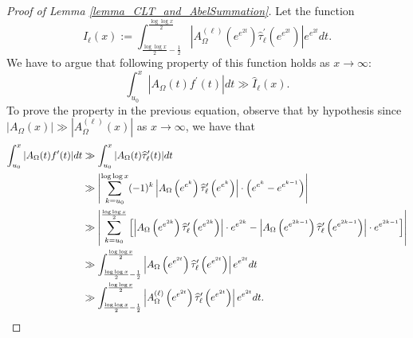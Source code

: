 \documentclass[11pt,reqno,a4letter]{article}
\numberwithin{figure}{section}
\numberwithin{table}{section}
\theoremstyle{plain}
\numberwithin{theorem}{section}
\theoremstyle{definition}
\begin{document}
\begin{proof}[Proof of Lemma \ref{lemma_CLT_and_AbelSummation}]
Let the function 
\[
\widehat{I}_{\ell}(x) := \int_{\frac{\log\log x}{2} - \frac{1}{2}}^{\frac{\log\log x}{2}} 
     \left\lvert A_{\Omega}^{(\ell)}\left(e^{e^{2t}}\right) 
     \widehat{\tau}_{\ell}^{\prime}\left(e^{e^{2t}}\right) 
     \right\rvert e^{e^{2t}} dt. 
\]
We have to argue that following property of this function holds as $x \rightarrow \infty$: 
$$\int_{u_0}^{x} 
     |A_{\Omega}(t) f^{\prime}(t)| dt \gg \widehat{I}_{\ell}(x).$$
To prove the property in the previous equation, observe that by hypothesis since 
$|A_{\Omega}(x)| \gg |A_{\Omega}^{(\ell)}(x)|$ as $x \rightarrow \infty$, 
we have that 
\begin{align*} 
\int_{u_0}^{x} |A_{\Omega}(t) f^{\prime}(t)| dt & \gg 
     \int_{u_0}^{x} |A_{\Omega}(t) \widehat{\tau}_{\ell}^{\prime}(t)| dt \\ 
     & \gg \left\lvert \sum_{k=u_0}^{\log\log x} (-1)^{k} 
     \left\lvert A_{\Omega}\left(e^{e^{k}}\right) 
     \widehat{\tau}_{\ell}^{\prime}\left(e^{e^{k}}\right) \right\rvert \cdot \left( 
     e^{e^{k}} - e^{e^{k-1}}\right) \right\rvert \\ 
     & \gg \left\lvert \sum_{k=u_0}^{\frac{\log\log x}{2}} \left[ 
     \left\lvert A_{\Omega}\left(e^{e^{2k}}\right) 
     \widehat{\tau}_{\ell}^{\prime}\left(e^{e^{2k}}\right) \right\rvert \cdot e^{e^{2k}} - 
     \left\lvert A_{\Omega}\left(e^{e^{2k-1}}\right) 
     \widehat{\tau}_{\ell}^{\prime}\left(e^{e^{2k-1}}\right) \right\rvert \cdot e^{e^{2k-1}} 
     \right] \right\rvert \\ 
     & \gg 
     \int_{\frac{\log\log x}{2} - \frac{1}{2}}^{\frac{\log\log x}{2}} 
     \left\lvert A_{\Omega}\left(e^{e^{2t}}\right) 
     \widehat{\tau}_{\ell}^{\prime}\left(e^{e^{2t}}\right) 
     \right\rvert e^{e^{2t}} dt \\ 
     & \gg 
     \int_{\frac{\log\log x}{2} - \frac{1}{2}}^{\frac{\log\log x}{2}} 
     \left\lvert A_{\Omega}^{(\ell)}\left(e^{e^{2t}}\right) 
     \widehat{\tau}_{\ell}^{\prime}\left(e^{e^{2t}}\right) 
     \right\rvert e^{e^{2t}} dt. 
     \qedhere 
\end{align*} 
\end{proof} 
\end{document}
